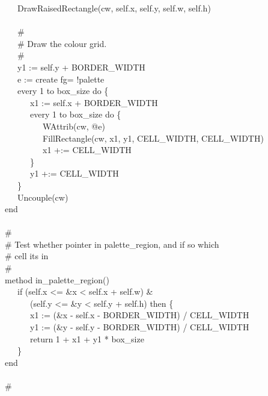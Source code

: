 {\>   \ \ \ DrawRaisedRectangle(cw, self.x, self.y, self.w, self.h) \\
\ \\
\>   \ \ \ \# \\
\>   \ \ \ \# Draw the colour grid. \\
\>   \ \ \ \# \\
\>   \ \ \ y1 := self.y + BORDER\_WIDTH \ \ \ \ \  \\
\>   \ \ \ e := create {\textquotedbl}fg={\textquotedbl}
{\textbar}{\textbar} !palette \\
\>   \ \ \ every 1 to box\_size do \{ \\
\>   \ \ \ \ \ \ x1 := self.x + BORDER\_WIDTH \  \\
\>   \ \ \ \ \ \ every 1 to box\_size do \{ \\
\>   \ \ \ \ \ \ \ \ \ WAttrib(cw, @e) \\
\>   \ \ \ \ \ \ \ \ \ FillRectangle(cw, x1, y1, CELL\_WIDTH,
CELL\_WIDTH) \\
\>   \ \ \ \ \ \ \ \ \ x1 +:= CELL\_WIDTH \\
\>   \ \ \ \ \ \ \} \\
\>   \ \ \ \ \ \ y1 +:= CELL\_WIDTH \\
\>   \ \ \ \} \\
\>   \ \ \ Uncouple(cw) \\
\>   end \\
\ \\
\>   \# \\
\>   \# Test whether pointer in palette\_region, and if so which  \\
\>   \# cell it{\textquotesingle}s in \\
\>   \# \\
\>   method in\_palette\_region() \\
\>   \ \ \ if (self.x {\textless}= \&x {\textless} self.x + self.w) \& \\
\>   \ \ \ \ \ \ (self.y {\textless}= \&y {\textless} self.y + self.h)
then \{ \\
\>   \ \ \ \ \ \ x1 := (\&x - self.x - BORDER\_WIDTH) / CELL\_WIDTH \\
\>   \ \ \ \ \ \ y1 := (\&y - self.y - BORDER\_WIDTH) / CELL\_WIDTH \\
\>   \ \ \ \ \ \ return 1 + x1 + y1 * box\_size \\
\>   \ \ \ \} \\
\>   end \\
\ \\
\>   \# \\
}
